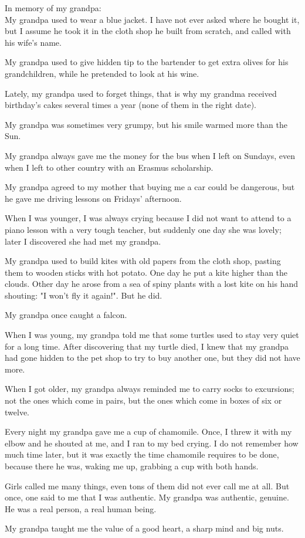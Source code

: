 \begin{itshape}

In memory of my grandpa:\\

My grandpa used to wear a blue jacket. I have not ever asked where he bought it, but I assume he took it in the  cloth shop he built from scratch, and called with his wife's name.

My grandpa used to give hidden tip to the bartender to get extra olives for his grandchildren, while he pretended to look at his wine.

Lately, my grandpa used to forget things, that is why my grandma received birthday's cakes several times a year (none of them in the right date).

My grandpa was sometimes very grumpy, but his smile warmed more than the Sun.

My grandpa always gave me the money for the bus when I left on Sundays, even when I left to other country with an Erasmus scholarship.

My grandpa agreed to my mother that buying me a car could be dangerous, but he gave me driving lessons on Fridays' afternoon.

When I was younger, I was always crying because I did not want to attend to a piano lesson with a very tough teacher, but suddenly one day she was lovely; later I discovered she had met my grandpa.

My grandpa used to build kites with old papers from the cloth shop, pasting them to wooden sticks with hot potato. One day he put a kite higher than the clouds. Other day he arose from a sea of spiny plants with a lost kite on his hand shouting: "I won't fly it again!". But he did.

My grandpa once caught a falcon.

When I was young, my grandpa told me that some turtles used to stay very quiet for a long time. After discovering that my turtle died, I knew that my grandpa had gone hidden to the pet shop to try to buy another one, but they did not have more.

When I got older, my grandpa always reminded me to carry socks to excursions; not the ones which come in pairs, but the ones which come in boxes of six or twelve.

Every night my grandpa gave me a cup of chamomile. Once, I threw it with my elbow and he shouted at me, and I ran to my bed crying. I do not remember how much time later, but it was exactly the time chamomile requires to be done, because there he was, waking me up, grabbing a cup with both hands.

Girls called me many things, even tons of them did not ever call me at all. But once, one said to me that I was authentic. My grandpa was authentic, genuine. He was a real person, a real human being.

My grandpa taught me the value of a good heart, a sharp mind and big nuts.

\end{itshape}
